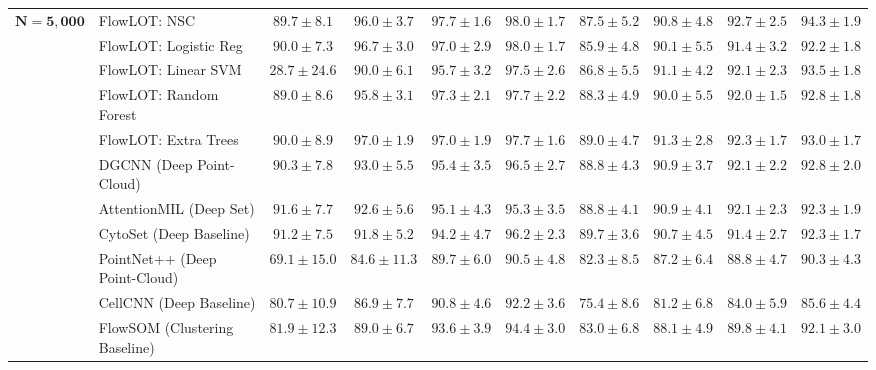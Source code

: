 \documentclass[10pt,journal,compsoc]{IEEEtran}
\begin{document}
\begin{table}[t]
\begin{tabular}{ll cccc cccc}
\midrule
\multirow{11}{*}{$\mathbf{N = 5,000}$} & FlowLOT: NSC & $89.7 \pm 8.1$ & $96.0 \pm 3.7$ & $97.7 \pm 1.6$ & $98.0 \pm 1.7$ & $87.5 \pm 5.2$ & $90.8 \pm 4.8$ & $92.7 \pm 2.5$ & $94.3 \pm 1.9$ \\
 & FlowLOT: Logistic Reg & $90.0 \pm 7.3$ & $96.7 \pm 3.0$ & $97.0 \pm 2.9$ & $98.0 \pm 1.7$ & $85.9 \pm 4.8$ & $90.1 \pm 5.5$ & $91.4 \pm 3.2$ & $92.2 \pm 1.8$ \\
 & FlowLOT: Linear SVM & $28.7 \pm 24.6$ & $90.0 \pm 6.1$ & $95.7 \pm 3.2$ & $97.5 \pm 2.6$ & $86.8 \pm 5.5$ & $91.1 \pm 4.2$ & $92.1 \pm 2.3$ & $93.5 \pm 1.8$ \\
 & FlowLOT: Random Forest & $89.0 \pm 8.6$ & $95.8 \pm 3.1$ & $97.3 \pm 2.1$ & $97.7 \pm 2.2$ & $88.3 \pm 4.9$ & $90.0 \pm 5.5$ & $92.0 \pm 1.5$ & $92.8 \pm 1.8$ \\
 & FlowLOT: Extra Trees & $90.0 \pm 8.9$ & $97.0 \pm 1.9$ & $97.0 \pm 1.9$ & $97.7 \pm 1.6$ & $89.0 \pm 4.7$ & $91.3 \pm 2.8$ & $92.3 \pm 1.7$ & $93.0 \pm 1.7$ \\
 & DGCNN (Deep Point-Cloud) & $90.3 \pm 7.8$ & $93.0 \pm 5.5$ & $95.4 \pm 3.5$ & $96.5 \pm 2.7$ & $88.8 \pm 4.3$ & $90.9 \pm 3.7$ & $92.1 \pm 2.2$ & $92.8 \pm 2.0$ \\
 & AttentionMIL (Deep Set) & $91.6 \pm 7.7$ & $92.6 \pm 5.6$ & $95.1 \pm 4.3$ & $95.3 \pm 3.5$ & $88.8 \pm 4.1$ & $90.9 \pm 4.1$ & $92.1 \pm 2.3$ & $92.3 \pm 1.9$ \\
 & CytoSet (Deep Baseline) & $91.2 \pm 7.5$ & $91.8 \pm 5.2$ & $94.2 \pm 4.7$ & $96.2 \pm 2.3$ & $89.7 \pm 3.6$ & $90.7 \pm 4.5$ & $91.4 \pm 2.7$ & $92.3 \pm 1.7$ \\
 & PointNet++ (Deep Point-Cloud) & $69.1 \pm 15.0$ & $84.6 \pm 11.3$ & $89.7 \pm 6.0$ & $90.5 \pm 4.8$ & $82.3 \pm 8.5$ & $87.2 \pm 6.4$ & $88.8 \pm 4.7$ & $90.3 \pm 4.3$ \\
 & CellCNN (Deep Baseline) & $80.7 \pm 10.9$ & $86.9 \pm 7.7$ & $90.8 \pm 4.6$ & $92.2 \pm 3.6$ & $75.4 \pm 8.6$ & $81.2 \pm 6.8$ & $84.0 \pm 5.9$ & $85.6 \pm 4.4$ \\
 & FlowSOM (Clustering Baseline) & $81.9 \pm 12.3$ & $89.0 \pm 6.7$ & $93.6 \pm 3.9$ & $94.4 \pm 3.0$ & $83.0 \pm 6.8$ & $88.1 \pm 4.9$ & $89.8 \pm 4.1$ & $92.1 \pm 3.0$ \\
\bottomrule
\end{tabular}
\end{table}
\end{document}
